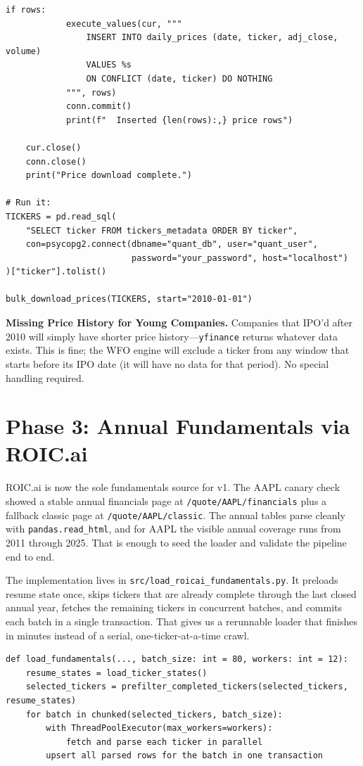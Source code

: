 \documentclass[11pt, oneside]{book}
\begin{document}
\begin{lstlisting}[style=pythonstyle, caption={Bulk Price Download via yfinance (2010--Present)}]
        if rows:
            execute_values(cur, """
                INSERT INTO daily_prices (date, ticker, adj_close, volume)
                VALUES %s
                ON CONFLICT (date, ticker) DO NOTHING
            """, rows)
            conn.commit()
            print(f"  Inserted {len(rows):,} price rows")

    cur.close()
    conn.close()
    print("Price download complete.")

# Run it:
TICKERS = pd.read_sql(
    "SELECT ticker FROM tickers_metadata ORDER BY ticker",
    con=psycopg2.connect(dbname="quant_db", user="quant_user",
                         password="your_password", host="localhost")
)["ticker"].tolist()

bulk_download_prices(TICKERS, start="2010-01-01")
\end{lstlisting}

\begin{warningbox}
\textbf{Missing Price History for Young Companies.} Companies that IPO'd after 2010 will simply have shorter price history---\texttt{yfinance} returns whatever data exists. This is fine; the WFO engine will exclude a ticker from any window that starts before its IPO date (it will have no data for that period). No special handling required.
\end{warningbox}

\section{Phase 3: Annual Fundamentals via ROIC.ai}

ROIC.ai is now the sole fundamentals source for v1. The AAPL canary check showed a stable annual financials page at \texttt{/quote/AAPL/financials} plus a fallback classic page at \texttt{/quote/AAPL/classic}. The annual tables parse cleanly with \texttt{pandas.read_html}, and for AAPL the visible annual coverage runs from 2011 through 2025. That is enough to seed the loader and validate the pipeline end to end.

The implementation lives in \texttt{src/load_roicai_fundamentals.py}. It preloads resume state once, skips tickers that are already complete through the last closed annual year, fetches the remaining tickers in concurrent batches, and commits each batch in a single transaction. That gives us a rerunnable loader that finishes in minutes instead of a serial, one-ticker-at-a-time crawl.

\begin{lstlisting}[style=pythonstyle, caption={Annual Fundamentals via ROIC.ai (Batched and Concurrent)}]
def load_fundamentals(..., batch_size: int = 80, workers: int = 12):
    resume_states = load_ticker_states()
    selected_tickers = prefilter_completed_tickers(selected_tickers, resume_states)
    for batch in chunked(selected_tickers, batch_size):
        with ThreadPoolExecutor(max_workers=workers):
            fetch and parse each ticker in parallel
        upsert all parsed rows for the batch in one transaction
\end{lstlisting}
\end{document}
